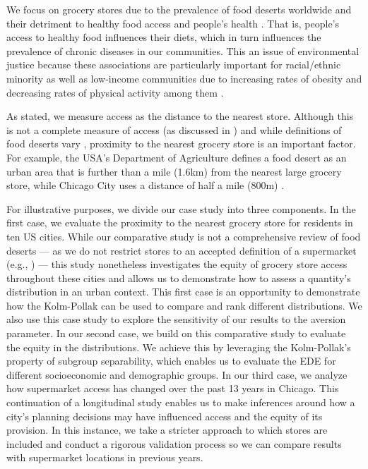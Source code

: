 \documentclass[final,3p,times,onecolumn,sort&compress]{elsarticle}
\begin{document}
We focus on grocery stores due to the prevalence of food deserts worldwide and their detriment to healthy food access and people's health \citep{Kolak2018-az, Garcia2020-xt,Apparicio2007-di, Walker2010-ch}.
That is, people's access to healthy food influences their diets, which in turn influences the prevalence of chronic diseases in our communities.
This an issue of environmental justice \citep{Kolak2018-az, Walker2010-ch} because these associations are particularly important for racial/ethnic minority as well as low-income communities due to increasing rates of obesity and decreasing rates of physical activity among them \citep{Krenichyn2006-ve,Day2006-ak}.

As stated, we measure access as the distance to the nearest store.
Although this is not a complete measure of access (as discussed in \cite{Penchansky1981-qh, Saurman2016-gj, Logan2019-fr}) and while definitions of food deserts vary \citep{Walker2010-ch}, proximity to the nearest grocery store is an important factor. 
For example, the USA’s Department of Agriculture defines a food desert as an urban area that is further than a mile (1.6km) from the nearest large grocery store, while Chicago City uses a distance of half a mile (800m) \citep{cdph2012-si}.

For illustrative purposes, we divide our case study into three components.
In the first case, we evaluate the proximity to the nearest grocery store for residents in ten US cities. 
While our comparative study is not a comprehensive review of food deserts --- as we do not restrict stores to an accepted definition of a supermarket (e.g., \cite{Kolak2018-az}) --- this study nonetheless investigates the equity of grocery store access throughout these cities and allows us to demonstrate how to assess a quantity's distribution in an urban context. 
This first case is an opportunity to demonstrate how the Kolm-Pollak can be used to compare and rank different distributions.
We also use this case study to explore the sensitivity of our results to the aversion parameter.
In our second case, we build on this comparative study to evaluate the equity in the distributions.
We achieve this by leveraging the Kolm-Pollak's property of subgroup separability, which enables us to evaluate the EDE for different socioeconomic and demographic groups.
In our third case, we analyze how supermarket access has changed over the past 13 years in Chicago.
This continuation of a longitudinal study enables us to make inferences around how a city's planning decisions may have influenced access and the equity of its provision.
In this instance, we take a stricter approach to which stores are included and conduct a rigorous validation process so we can compare results with supermarket locations in previous years.
\end{document}
